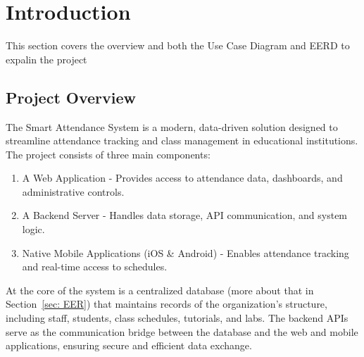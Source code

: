 \documentclass[a4paper, 12pt]{article}
\begin{document}
  \pagebreak
  \tableofcontents

  \listoffigures
  \pagebreak

  \section{Introduction}
    This section covers the overview and both the Use Case Diagram and EERD to expalin the project

    \subsection{Project Overview}
      The Smart Attendance System is a modern, data-driven solution designed to streamline attendance tracking and class management in educational institutions. The project consists of three main components:
      \begin{enumerate}
        \item A Web Application - Provides access to attendance data, dashboards, and administrative controls.
        \item A Backend Server - Handles data storage, API communication, and system logic.
        \item Native Mobile Applications (iOS \& Android) - Enables attendance tracking and real-time access to schedules.
      \end{enumerate}
    
      \noindent At the core of the system is a centralized database (more about that in Section~\ref{sec: EER}) that maintains records of the organization's structure, including staff, students, class schedules, tutorials, and labs.
      The backend APIs serve as the communication bridge between the database and the web and mobile applications, ensuring secure and efficient data exchange. \\
\end{document}
